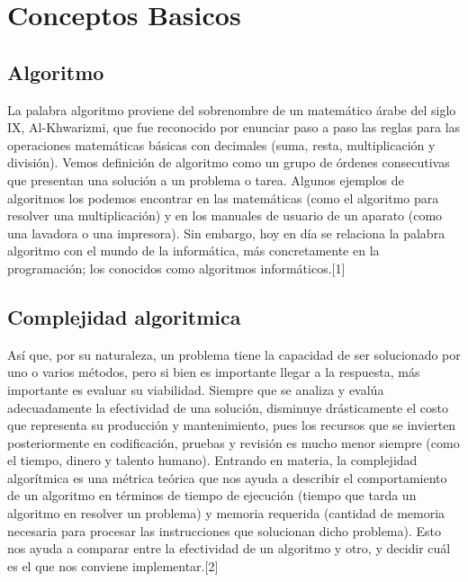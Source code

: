 \documentclass[spanish]{article}
\begin{document}
	\section{Conceptos Basicos}
	\subsection{Algoritmo}
	La palabra algoritmo proviene del sobrenombre de un matemático árabe del siglo IX, Al-Khwarizmi, que fue reconocido por enunciar paso a paso las reglas para las operaciones matemáticas básicas con decimales (suma, resta, multiplicación y división).	
	Vemos definición de algoritmo como un grupo de órdenes consecutivas que presentan una solución a un problema o tarea. Algunos ejemplos de algoritmos los podemos encontrar en las matemáticas (como el algoritmo para resolver una multiplicación) y en los manuales de usuario de un aparato (como una lavadora o una impresora).	
	Sin embargo, hoy en día se relaciona la palabra algoritmo con el mundo de la informática, más concretamente en la programación; los conocidos como algoritmos informáticos.[1]	
	\subsection{Complejidad algoritmica}
	Así que, por su naturaleza, un problema tiene la capacidad de ser solucionado por uno o varios métodos, pero si bien es importante llegar a la respuesta, más importante es evaluar su viabilidad. Siempre que se analiza y evalúa adecuadamente la efectividad de una solución, disminuye drásticamente el costo que representa su producción y mantenimiento, pues los recursos que se invierten posteriormente en codificación, pruebas y revisión es mucho menor siempre (como el tiempo, dinero y talento humano).	
	Entrando en materia, la complejidad algorítmica es una métrica teórica que nos ayuda a describir el comportamiento de un algoritmo en términos de tiempo de ejecución (tiempo que tarda un algoritmo en resolver un problema) y memoria requerida (cantidad de memoria necesaria para procesar las instrucciones que solucionan dicho problema). Esto nos ayuda a comparar entre la efectividad de un algoritmo y otro, y decidir cuál es el que nos conviene implementar.[2]
\end{document}
